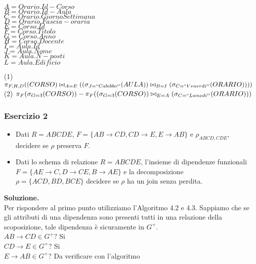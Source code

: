   \begin{multicols}{3}
  \begin{flushleft}
   $A = Orario.Id-Corso$\\
   $B = Orario.Id-Aula$\\
   $C = Orario.GiornoSettimana$\\
   $D = Orario.Fascia-oraria$\\
   $E = Corso.Id$\\
   $F = Corso.Titolo$\\
   $G = Corso.Anno$\\
   $H = Corso.Docente$\\
   $I = Aula.Id$\\
   $J = Aula.Nome$\\
   $K = Aula.N-posti$\\
   $L = Aula.Edificio$\\
  \end{flushleft}
  \end{multicols}

 \noindent(1) $\pi_{F, H, D}((CORSO)\bowtie_{A=E}((\sigma_{J=``Cabibbo''}(AULA))\bowtie_{B=I}(\sigma_{C=``Venerdi''}(ORARIO))))$\\
 (2) $\pi_{F}(\sigma_{G=3}(CORSO)) -\pi_{F}((\sigma_{G=3}(CORSO))\bowtie_{E=A}(\sigma_{C=``Lunedi''}(ORARIO)))$\\

  \subsubsection{Esercizio 2}
 
 \begin{itemize}
  \item Dati $R=ABCDE$, $F=\{AB\rightarrow CD, CD\rightarrow E, E\rightarrow AB\}$ e $\rho_{ABCD, CDE}$, decidere se $\rho$
  preserva $F$.
  \item Dati lo schema di relazione $R=ABCDE$, l'insieme di dipendenze funzionali $F=\{AE\rightarrow C, D\rightarrow CE, B\rightarrow AE\}$
  e la decomposizione $\rho =\{ACD, BD, BCE\}$ decidere se $\rho$ ha un join senza perdita. 
 \end{itemize}
 
 \noindent\textbf{\fontsize{14pt}{1em}Soluzione.}\\
 Per rispondere al primo punto utilizziamo l'Algoritmo 4.2 e 4.3. Sappiamo che se gli attributi di una dipendenza sono presenti
 tutti in una relazione della scoposizione, tale dipendenza è sicuramente in $G^+$.\\
 $AB\rightarrow CD \in G^+$? Si\\
 $CD\rightarrow E \in G^+$? Si\\
 $E\rightarrow AB \in G^+$? Da verificare con l'algoritmo\\
 
